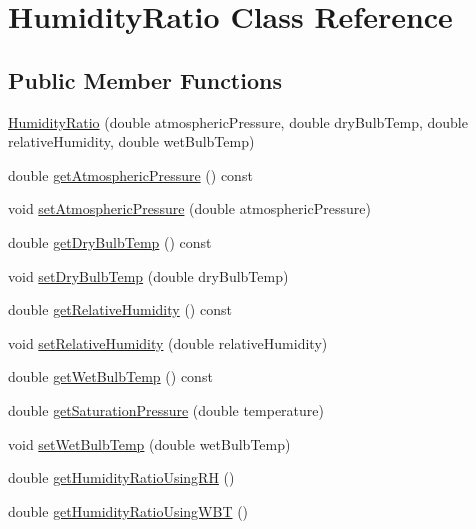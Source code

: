 \hypertarget{class_humidity_ratio}{}\section{Humidity\+Ratio Class Reference}
\label{class_humidity_ratio}
\subsection*{Public Member Functions}
\begin{DoxyCompactItemize}
\item 
\hyperlink{class_humidity_ratio_a504da4363c7291a09107360de2ee709a}{Humidity\+Ratio} (double atmospheric\+Pressure, double dry\+Bulb\+Temp, double relative\+Humidity, double wet\+Bulb\+Temp)
\item 
double \hyperlink{class_humidity_ratio_a7814687795a87a3822e4584773938741}{get\+Atmospheric\+Pressure} () const
\item 
void \hyperlink{class_humidity_ratio_aebab92be0c5eb4f23baaeb7268dad87e}{set\+Atmospheric\+Pressure} (double atmospheric\+Pressure)
\item 
double \hyperlink{class_humidity_ratio_a737b2faf32e5271b8062b175e1d018a9}{get\+Dry\+Bulb\+Temp} () const
\item 
void \hyperlink{class_humidity_ratio_a291bccce6b8665412987a31bd2633d9a}{set\+Dry\+Bulb\+Temp} (double dry\+Bulb\+Temp)
\item 
double \hyperlink{class_humidity_ratio_af761b52e96bdf995e1a2bbbfd9e3b47f}{get\+Relative\+Humidity} () const
\item 
void \hyperlink{class_humidity_ratio_a110aecb6587a836ab76d4aca840e5759}{set\+Relative\+Humidity} (double relative\+Humidity)
\item 
double \hyperlink{class_humidity_ratio_adbadf93878e4867ce283319859d04087}{get\+Wet\+Bulb\+Temp} () const
\item 
double \hyperlink{class_humidity_ratio_a29d3152c2f14fd47f9ee34c0787049cf}{get\+Saturation\+Pressure} (double temperature)
\item 
void \hyperlink{class_humidity_ratio_a5bda925f783cb4cef848245b00e28e29}{set\+Wet\+Bulb\+Temp} (double wet\+Bulb\+Temp)
\item 
double \hyperlink{class_humidity_ratio_af711463f09fa91544c2b69dc24817fed}{get\+Humidity\+Ratio\+Using\+RH} ()
\item 
double \hyperlink{class_humidity_ratio_ad33fa981783bae96c17171f12b9cf2bd}{get\+Humidity\+Ratio\+Using\+W\+BT} ()
\item 

\end{DoxyCompactItemize}
